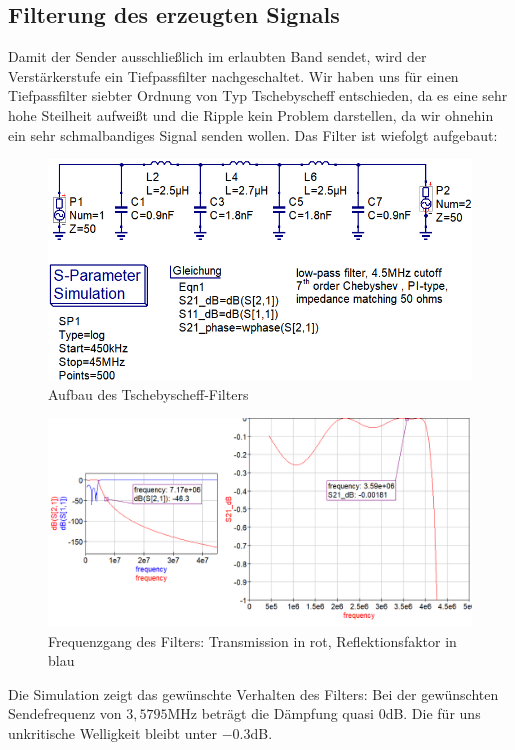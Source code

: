\subsection{Filterung des erzeugten Signals}
Damit der Sender ausschließlich im erlaubten Band sendet, wird der Verstärkerstufe
ein Tiefpassfilter nachgeschaltet. Wir haben uns für einen Tiefpassfilter siebter 
Ordnung von Typ Tschebyscheff entschieden, da es eine sehr hohe Steilheit aufweißt
und die Ripple kein Problem darstellen, da wir ohnehin ein sehr schmalbandiges
Signal senden wollen. Das Filter ist wiefolgt aufgebaut:
\begin{figure}[H]
    \includegraphics{res/TP_Schaltplan.png}
    \caption{Aufbau des Tschebyscheff-Filters}
\end{figure}

\begin{figure}[H]
    \includegraphics[scale=0.6]{res/TP_Simulation.png}
    \caption{Frequenzgang des Filters: Transmission in rot, Reflektionsfaktor in blau}
\end{figure}
Die Simulation zeigt das gewünschte Verhalten des Filters: Bei der gewünschten
Sendefrequenz von $3,5795$MHz beträgt die Dämpfung quasi $0$dB.
Die für uns unkritische Welligkeit bleibt unter $-0.3$dB.

